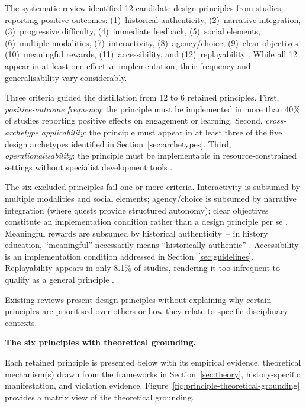The systematic review identified 12 candidate design principles from studies reporting positive outcomes: (1)~historical authenticity, (2)~narrative integration, (3)~progressive difficulty, (4)~immediate feedback, (5)~social elements, (6)~multiple modalities, (7)~interactivity, (8)~agency/choice, (9)~clear objectives, (10)~meaningful rewards, (11)~accessibility, and (12)~replayability \cite{KorniienkoSemerikov2024, LaineLindberg2020}. While all 12 appear in at least one effective implementation, their frequency and generalisability vary considerably.

Three criteria guided the distillation from 12 to 6 retained principles. First, \textit{positive-outcome frequency}: the principle must be implemented in more than 40\% of studies reporting positive effects on engagement or learning. Second, \textit{cross-archetype applicability}: the principle must appear in at least three of the five design archetypes identified in Section~\ref{sec:archetypes}. Third, \textit{operationalisability}: the principle must be implementable in resource-constrained settings without specialist development tools \cite{Hong2024, Toda2019}.

The six excluded principles fail one or more criteria. Interactivity is subsumed by multiple modalities and social elements; agency/choice is subsumed by narrative integration (where quests provide structured autonomy); clear objectives constitute an implementation condition rather than a design principle per se \cite{LaineLindberg2020}. Meaningful rewards are subsumed by historical authenticity~-- in history education, ``meaningful'' necessarily means ``historically authentic'' \cite{Nicholson2015}. Accessibility is an implementation condition addressed in Section~\ref{sec:guidelines}. Replayability appears in only 8.1\% of studies, rendering it too infrequent to qualify as a general principle \cite{KorniienkoSemerikov2024}.

Existing reviews present design principles without explaining why certain principles are prioritised over others or how they relate to specific disciplinary contexts.

\textbf{The six principles with theoretical grounding.} \label{sec:principle-grounding}

Each retained principle is presented below with its empirical evidence, theoretical mechanism(s) drawn from the frameworks in Section~\ref{sec:theory}, history-specific manifestation, and violation evidence. Figure~\ref{fig:principle-theoretical-grounding} provides a matrix view of the theoretical grounding.

